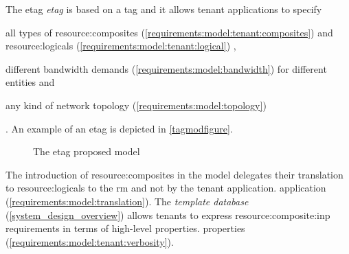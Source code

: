 \ifdefined\THESISSUMMARY \else
{}
\fi
The
\ifdefined\THESISSUMMARY 
\gls{etag}
\else
\textit{\gls{etag}} is based on a \gls{tag} and it
\fi
allows tenant applications to specify
\begin{mylist}
    \item all types of \glspl{resource:composite}
    \ifdefined\THESISSUMMARY \else
    (\cmark \ref{requirements:model:tenant:composites})
    \fi
    and \glspl{resource:logical}\ifdefined\THESISSUMMARY \else
    (\cmark \ref{requirements:model:tenant:logical}) \fi,
    \item different bandwidth demands
    \ifdefined\THESISSUMMARY \else
    (\cmark \ref{requirements:model:bandwidth})
    \fi
    for different entities and
    \item any kind of network topology
    \ifdefined\THESISSUMMARY \else
    (\cmark \ref{requirements:model:topology})
    \fi
\end{mylist}.
An example of an \gls{etag} is depicted in \autoref{tagmodfigure}.

\begin{figure}[!htb]
    \centering
    \usebox{\tagmodfigure}
    \caption{The \gls{etag} proposed model}
    \label{tagmodfigure}
\end{figure}

The introduction of \glspl{resource:composite} in the model delegates their translation to \glspl{resource:logical} to the \gls{rm} and not by the tenant
\ifdefined\THESISSUMMARY
application.
\else
application (\cmark \ref{requirements:model:translation}).
\fi
The \textit{template database}
\ifdefined\THESISSUMMARY \else
(\autoref{system_design_overview})
\fi
allows tenants to express \gls{resource:composite:inp} requirements in terms of high-level
\ifdefined\THESISSUMMARY
properties.
\else
properties (\cmark \ref{requirements:model:tenant:verbosity}).
\fi

